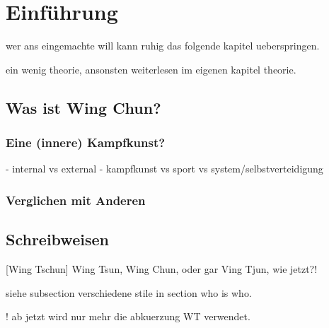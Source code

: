 

\renewcommand\chapterillustration{pushing_minimalistisch}
\chapter{Einf\"uhrung}

wer ans eingemachte will kann ruhig das folgende kapitel ueberspringen.

ein wenig theorie, ansonsten weiterlesen im eigenen kapitel theorie.


\section{Was ist Wing Chun?}

\subsection{Eine (innere) Kampfkunst?}

- internal vs external
- kampfkunst vs sport vs system/selbstverteidigung

\subsection{Verglichen mit Anderen}


\section{Schreibweisen}

[Wing Tschun]
Wing Tsun, Wing Chun, oder gar Ving Tjun, wie jetzt?!

siehe subsection verschiedene stile in section who is who.

! ab jetzt wird nur mehr die abkuerzung WT verwendet.